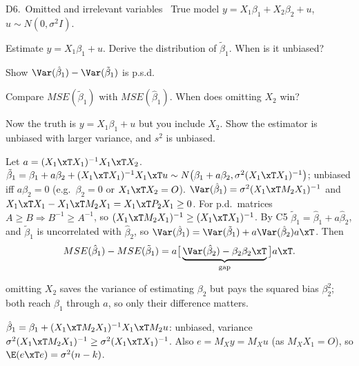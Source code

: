 \begin{qbox}{D6.\ Omitted and irrelevant variables}{\likely\ \newtag}
True model $y=X_{1}\beta_{1}+X_{2}\beta_{2}+u$, $u\sim N(0,\sigma^{2}I)$.
\begin{flatlist}
  \item[(a)] Estimate $y=X_{1}\beta_{1}+u$. Derive the distribution of $\tilde\beta_{1}$. When is it unbiased?
  \item[(b)] Show $\Var(\hat\beta_{1})-\Var(\tilde\beta_{1})$ is p.s.d.
  \item[(c)] Compare $MSE(\tilde\beta_{1})$ with $MSE(\hat\beta_{1})$. When does omitting $X_{2}$ win?
  \item[(d)] Now the truth is $y=X_{1}\beta_{1}+u$ but you include $X_{2}$. Show the estimator is unbiased with larger variance, and $s^{2}$ is unbiased.
\end{flatlist}
\end{qbox}
\begin{solbox}
Let $a=(X_{1}\xT X_{1})^{-1}X_{1}\xT X_{2}$.
 $\tilde\beta_{1}=\beta_{1}+a\beta_{2}+(X_{1}\xT X_{1})^{-1}X_{1}\xT u\sim N\big(\beta_{1}+a\beta_{2},\sigma^{2}(X_{1}\xT X_{1})^{-1}\big)$;
unbiased iff $a\beta_{2}=0$ (e.g.\ $\beta_{2}=0$ or $X_{1}\xT X_{2}=O$).
 $\Var(\hat\beta_{1})=\sigma^{2}(X_{1}\xT M_{2}X_{1})^{-1}$ and $X_{1}\xT X_{1}-X_{1}\xT M_{2}X_{1}=X_{1}\xT P_{2}X_{1}\ge0$. For p.d.\ matrices $A\ge B\Rightarrow B^{-1}\ge A^{-1}$, so
$(X_{1}\xT M_{2}X_{1})^{-1}\ge(X_{1}\xT X_{1})^{-1}$.
 By C5 $\tilde\beta_{1}=\hat\beta_{1}+a\hat\beta_{2}$, and $\tilde\beta_{1}$ is uncorrelated with $\hat\beta_{2}$, so
$\Var(\hat\beta_{1})=\Var(\tilde\beta_{1})+a\Var(\hat\beta_{2})a\xT$. Then
\[
  MSE(\hat\beta_{1})-MSE(\tilde\beta_{1})=a\big[\underbrace{\Var(\hat\beta_{2})-\beta_{2}\beta_{2}\xT}_{\text{gap}}\big]a\xT .
\]
\begin{why}\Why omitting $X_{2}$ saves the variance of estimating $\beta_{2}$ but pays the squared bias $\beta_{2}^{2}$; both reach $\beta_{1}$ through $a$, so only their difference matters.\end{why}
 $\hat\beta_{1}=\beta_{1}+(X_{1}\xT M_{2}X_{1})^{-1}X_{1}\xT M_{2}u$: unbiased, variance $\sigma^{2}(X_{1}\xT M_{2}X_{1})^{-1}\ge\sigma^{2}(X_{1}\xT X_{1})^{-1}$.
Also $e=M_{X}y=M_{X}u$ (as $M_{X}X_{1}=O$), so $\E(e\xT e)=\sigma^{2}(n-k)$.
\end{solbox}


